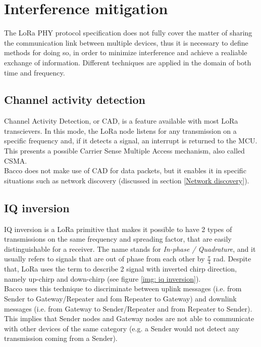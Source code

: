 \section{Interference mitigation}
The LoRa PHY protocol specification does not fully cover the matter of sharing the communication link between multiple
devices, thus it is necessary to define methods for doing so, in order to minimize interference and achieve
a realiable exchange of information. Different techniques are applied in the domain of both time and frequency.

\subsection{Channel activity detection}
Channel Activity Detection, or CAD, is a feature available with most LoRa transcievers\cite{cad}. In this mode, the LoRa node
listens for any transmission on a specific frequency and, if it detects a signal, an interrupt is returned to the MCU. This
presents a possible Carrier Sense Multiple Access mechanism, also called CSMA.\\
Bacco does not make use of CAD for data packets, but it enables it in specific situations such as network discovery (discussed
in section \ref{Network discovery}).

\subsection{IQ inversion}
IQ inversion is a LoRa primitive that makes it possible to have 2 types of transmissions on the same frequency and
spreading factor, that are easily
distinguishable for a receiver. The name stands for \emph{In-phase / Quadrature}, and it usually refers to
signals that are out of phase from each other by $\frac{\pi}{4}$ rad. Despite that, LoRa uses the term to describe
2 signal with inverted chirp direction, namely up-chirp and down-chirp (see figure \ref{img: iq inversion}).\\
Bacco uses this technique to discriminate between uplink messages (i.e. from Sender to
Gateway/Repeater and fom Repeater to Gateway) and downlink messages (i.e. from Gateway to Sender/Repeater and from
Repeater to Sender). This implies that Sender nodes and Gateway nodes are not able to communicate with other devices of
the same category (e.g. a Sender would not detect any transmission coming from a Sender).

